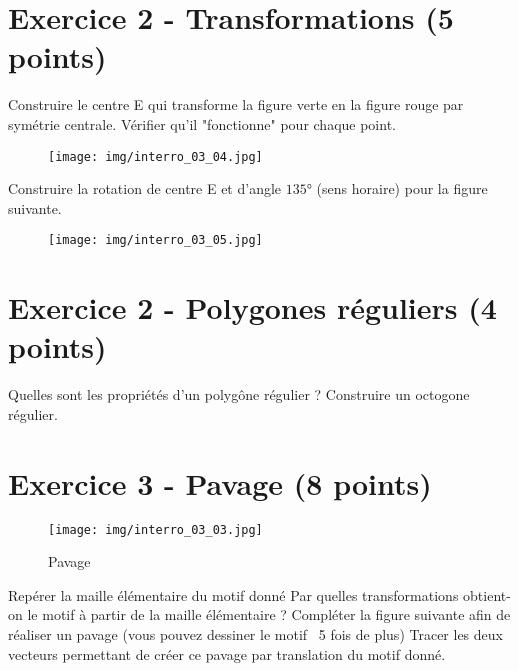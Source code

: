 \documentclass[answers]{exam}
\begin{document}
\section*{Exercice 2 - Transformations (5 points)}
\begin{questions}
\question[2] Construire le centre E qui transforme la figure verte en la figure rouge par symétrie centrale. Vérifier qu'il "fonctionne" pour chaque point.
\begin{figure}[H]
  \centering
  \texttt{[image: img/interro\_03\_04.jpg]}
\end{figure}

\question[3] Construire la rotation de centre E et d'angle $135°$ (sens horaire) pour la figure suivante.

\begin{figure}[H]
  \centering
  \texttt{[image: img/interro\_03\_05.jpg]}
\end{figure}
\end{questions}

\section*{Exercice 2 - Polygones réguliers (4 points)}

\begin{questions}
  \question[1] Quelles sont les propriétés d'un polygône régulier ?
  \question[3] Construire un octogone régulier.
\end{questions}

\section*{Exercice 3 - Pavage (8 points)}

\begin{figure}[H]
  \centering
  \texttt{[image: img/interro\_03\_03.jpg]}
  \captionsetup{labelformat=empty}
  \caption{\label{} Pavage}
\end{figure}

\begin{questions}
  \question[1] Repérer la maille élémentaire du motif donné 
  \question[3] Par quelles transformations obtient-on le motif à partir de la maille élémentaire ?
  \question[2] Compléter la figure suivante afin de réaliser un pavage (vous pouvez dessiner le motif ~5 fois de plus)
  \question[2] Tracer les deux vecteurs permettant de créer ce pavage par translation du motif donné.
\end{questions}
\end{document}
